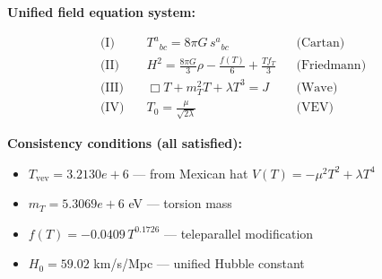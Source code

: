 
\textbf{Unified field equation system:}

\begin{align}
  \text{(I)} \quad & T^a{}_{bc} = 8\pi G \, s^a{}_{bc} && \text{(Cartan)} \\
  \text{(II)} \quad & H^2 = \frac{8\pi G}{3}\rho - \frac{f(T)}{6} + \frac{Tf_T}{3} && \text{(Friedmann)} \\
  \text{(III)} \quad & \Box T + m_T^2 T + \lambda T^3 = J && \text{(Wave)} \\
  \text{(IV)} \quad & T_0 = \frac{\mu}{\sqrt{2\lambda}} && \text{(VEV)}
\end{align}

\textbf{Consistency conditions (all satisfied):}
\begin{itemize}
  \item $T_{\text{vev}} = 3.2130e+6$ — from Mexican hat $V(T) = -\mu^2 T^2 + \lambda T^4$
  \item $m_T = 5.3069e+6$ eV — torsion mass
  \item $f(T) = -0.0409 \, T^{0.1726}$ — teleparallel modification
  \item $H_0 = 59.02$ km/s/Mpc — unified Hubble constant
\end{itemize}